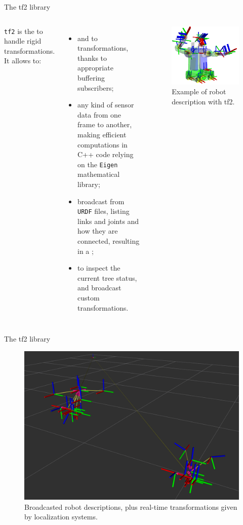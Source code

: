 \begin{frame}{The tf2 library}
	\begin{columns}
		\texttt{tf2} is the  to handle rigid transformations.\\
		\medskip
		It allows to:
		\begin{itemize}
			\item {} and  to transformations, thanks to appropriate buffering subscribers;
			\item {} any kind of sensor data from one frame to another, making efficient computations in C++ code relying on the \texttt{Eigen} mathematical library;
			\item broadcast  from \texttt{URDF} files, listing links and joints and how they are connected, resulting in a ;
			\item {} to inspect the current tree status, and broadcast custom transformations.
		\end{itemize}

		\begin{figure}
			\centering
			\includegraphics[width=.9\textwidth]{ros2_tf2}
			\caption{Example of robot description with tf2.}
			\label{fig:tf2example}
		\end{figure}
	\end{columns}
\end{frame}
\begin{frame}{The tf2 library}
	\begin{figure}
		\centering
		\includegraphics[width=.58\textwidth]{tfs}
		\caption{Broadcasted robot descriptions, plus real-time transformations given by localization systems.}
		\label{fig:tfs}
	\end{figure}
\end{frame}
